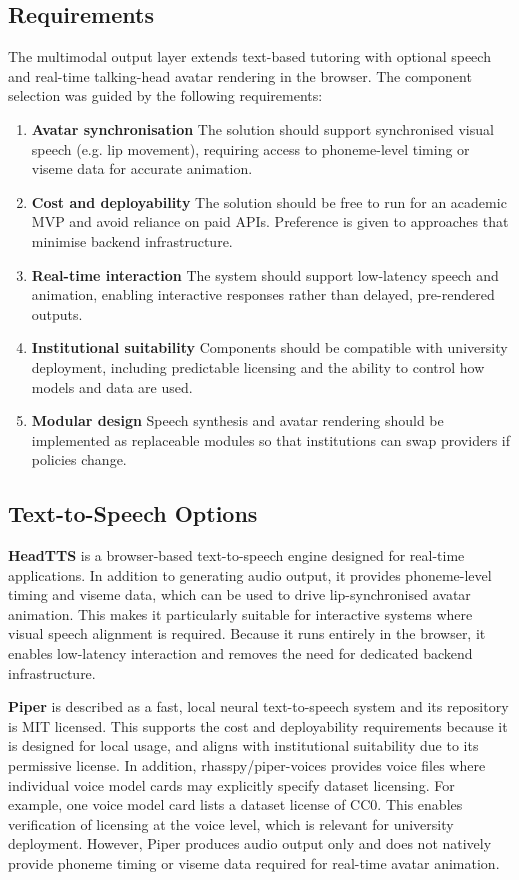 \subsection{Requirements}
The multimodal output layer extends text-based tutoring with optional speech and real-time talking-head avatar rendering in the browser. The component selection was guided by the following requirements:
\begin{enumerate}
    \item \textbf{Avatar synchronisation}  
    The solution should support synchronised visual speech (e.g. lip movement), requiring access to phoneme-level timing or viseme data for accurate animation.
    \item \textbf{Cost and deployability}  
    The solution should be free to run for an academic MVP and avoid reliance on paid APIs. Preference is given to approaches that minimise backend infrastructure.
    \item \textbf{Real-time interaction}  
    The system should support low-latency speech and animation, enabling interactive responses rather than delayed, pre-rendered outputs.
    \item \textbf{Institutional suitability}  
    Components should be compatible with university deployment, including predictable licensing and the ability to control how models and data are used.
    \item \textbf{Modular design}
    Speech synthesis and avatar rendering should be implemented as replaceable modules so that institutions can swap providers if policies change.
    \end{enumerate}

\subsection{Text-to-Speech Options}

\textbf{HeadTTS} is a browser-based text-to-speech engine designed for real-time applications. In addition to generating audio output, it provides phoneme-level timing and viseme data, which can be used to drive lip-synchronised avatar animation. This makes it particularly suitable for interactive systems where visual speech alignment is required. Because it runs entirely in the browser, it enables low-latency interaction and removes the need for dedicated backend infrastructure. \parencite{met4citi17:online}


\textbf{Piper} is described as a fast, local neural text-to-speech system and its repository is MIT licensed. This supports the cost and deployability requirements because it is designed for local usage, and aligns with institutional suitability due to its permissive license. In addition, rhasspy/piper-voices provides voice files where individual voice model cards may explicitly specify dataset licensing. For example, one voice model card lists a dataset license of CC0. This enables verification of licensing at the voice level, which is relevant for university deployment. However, Piper produces audio output only and does not natively provide phoneme timing or viseme data required for real-time avatar animation. \parencite{piperLIC61:online, rhasspyp13:online, dedeDEth1:online}


